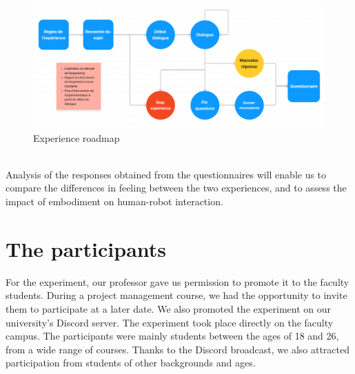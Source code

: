 \\
\begin{figure}[!h]
\centering
\includegraphics[width=2\textwidth, height=0.30\textheight,keepaspectratio]{Figures/Experience_Roadmap_Resize.png}
\caption{Experience roadmap}
\end{figure}
\\
Analysis of the responses obtained from the questionnaires will enable us to compare the differences in feeling between the two experiences, and to assess the impact of embodiment on human-robot interaction.\\

\section{The participants}

For the experiment, our professor gave us permission to promote it to the faculty students. During a project management course, we had the opportunity to invite them to participate at a later date. We also promoted the experiment on our university's Discord server. The experiment took place directly on the faculty campus. The participants were mainly students between the ages of 18 and 26, from a wide range of courses. Thanks to the Discord broadcast, we also attracted participation from students of other backgrounds and ages.\\
\\


